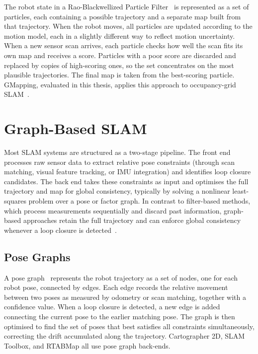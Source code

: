 The robot state in a Rao-Blackwellized Particle Filter~\cite{doucet2000rao}
is represented as a set of particles, each containing a possible trajectory
and a separate map built from that trajectory.
When the robot moves, all particles are updated according to the motion model,
each in a slightly different way to reflect motion uncertainty.
When a new sensor scan arrives, each particle checks how well the scan fits
its own map and receives a score.
Particles with a poor score are discarded and replaced by copies of
high-scoring ones, so the set concentrates on the most plausible
trajectories.
The final map is taken from the best-scoring particle.
GMapping, evaluated in this thesis, applies this approach to occupancy-grid
SLAM~\cite{grisetti2007gmapping}.

\section{Graph-Based SLAM}
\label{sec:graph_slam}

Most SLAM systems are structured as a two-stage pipeline.
The front end processes raw sensor data to extract relative pose
constraints (through scan matching, visual feature tracking, or IMU
integration) and identifies loop closure candidates.
The back end takes these constraints as input and optimises the full
trajectory and map for global consistency, typically by solving a nonlinear
least-squares problem over a pose or factor graph.
In contrast to filter-based methods, which process measurements sequentially
and discard past information, graph-based approaches retain the full trajectory
and can enforce global consistency whenever a loop closure is
detected~\cite{grisetti2010tutorial}.

\subsection{Pose Graphs}

A pose graph~\cite{grisetti2010tutorial} represents the robot trajectory as a
set of nodes, one for each robot pose, connected by edges.
Each edge records the relative movement between two poses as measured by
odometry or scan matching, together with a confidence value.
When a loop closure is detected, a new edge is added connecting the current
pose to the earlier matching pose.
The graph is then optimised to find the set of poses that best satisfies all
constraints simultaneously, correcting the drift accumulated along the
trajectory.
Cartographer 2D, SLAM Toolbox, and RTABMap all use pose graph back-ends.

